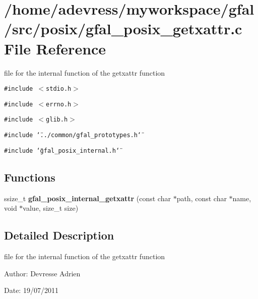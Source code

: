 \section{/home/adevress/myworkspace/gfal/src/posix/gfal\_\-posix\_\-getxattr.c File Reference}
\label{gfal__posix__getxattr_8c}
file for the internal function of the getxattr function 

{\tt \#include $<$stdio.h$>$}\par
{\tt \#include $<$errno.h$>$}\par
{\tt \#include $<$glib.h$>$}\par
{\tt \#include \char`\"{}../common/gfal\_\-prototypes.h\char`\"{}}\par
{\tt \#include \char`\"{}gfal\_\-posix\_\-internal.h\char`\"{}}\par
\subsection*{Functions}
\begin{CompactItemize}
\item 
ssize\_\-t \textbf{gfal\_\-posix\_\-internal\_\-getxattr} (const char $\ast$path, const char $\ast$name, void $\ast$value, size\_\-t size)\label{gfal__posix__getxattr_8c_ca798d7e3e0e14d6992669e7c125347f}

\end{CompactItemize}


\subsection{Detailed Description}
file for the internal function of the getxattr function 

\begin{Desc}
\item[Author:]Devresse Adrien \end{Desc}
\begin{Desc}
\item[Date:]19/07/2011 \end{Desc}
